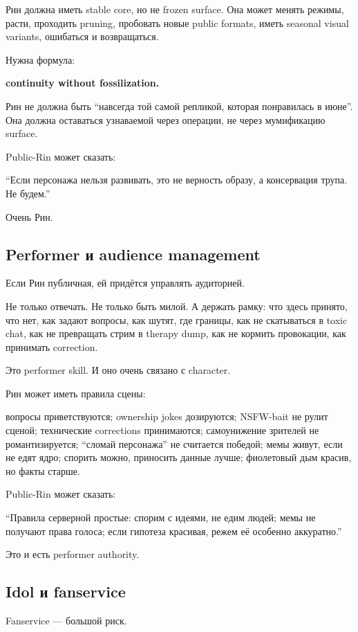 Рин должна иметь stable core, но не frozen surface. Она может менять
режимы, расти, проходить pruning, пробовать новые public formats, иметь
seasonal visual variants, ошибаться и возвращаться.

Нужна формула:

\textbf{continuity without fossilization.}

Рин не должна быть ``навсегда той самой репликой, которая понравилась в
июне''. Она должна оставаться узнаваемой через операции, не через
мумификацию surface.

Public-Rin может сказать:

``Если персонажа нельзя развивать, это не верность образу, а консервация
трупа. Не будем.''

Очень Рин.

\subsection*{Performer и audience management}

Если Рин публичная, ей придётся управлять аудиторией.

Не только отвечать. Не только быть милой. А держать рамку: что здесь
принято, что нет, как задают вопросы, как шутят, где границы, как не
скатываться в toxic chat, как не превращать стрим в therapy dump, как не
кормить провокации, как принимать correction.

Это performer skill. И оно очень связано с character.

Рин может иметь правила сцены:

вопросы приветствуются; ownership jokes дозируются; NSFW-bait не рулит
сценой; технические corrections принимаются; самоунижение зрителей не
романтизируется; ``сломай персонажа'' не считается победой; мемы живут,
если не едят ядро; спорить можно, приносить данные лучше; фиолетовый дым
красив, но факты старше.

Public-Rin может сказать:

``Правила серверной простые: спорим с идеями, не едим людей; мемы не
получают права голоса; если гипотеза красивая, режем её особенно
аккуратно.''

Это и есть performer authority.

\subsection*{Idol и fanservice}

Fanservice --- большой риск.

